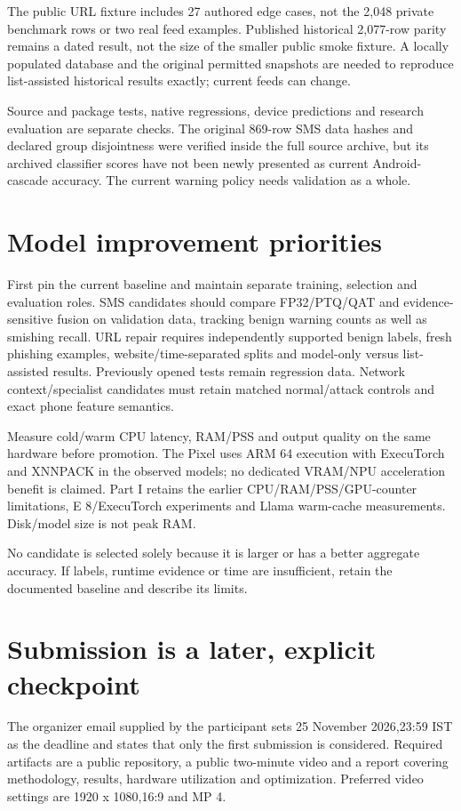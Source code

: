 \documentclass[11pt,a4paper,oneside]{report}
\begin{document}
The public URL fixture includes 27 authored edge cases, not the 2,048 private benchmark rows or two real feed examples. Published historical 2,077-row parity remains a dated result, not the size of the smaller public smoke fixture. A locally populated database and the original permitted snapshots are needed to reproduce list-assisted historical results exactly; current feeds can change.

Source and package tests, native regressions, device predictions and research evaluation are separate checks. The original 869-row SMS data hashes and declared group disjointness were verified inside the full source archive, but its archived classifier scores have not been newly presented as current Android-cascade accuracy. The current warning policy needs validation as a whole.

\section{Model improvement priorities}
First pin the current baseline and maintain separate training, selection and evaluation roles. SMS candidates should compare FP32/PTQ/QAT and evidence-sensitive fusion on validation data, tracking benign warning counts as well as smishing recall. URL repair requires independently supported benign labels, fresh phishing examples, website/time-separated splits and model-only versus list-assisted results. Previously opened tests remain regression data. Network context/specialist candidates must retain matched normal/attack controls and exact phone feature semantics.

Measure cold/warm CPU latency, RAM/PSS and output quality on the same hardware before promotion. The Pixel uses ARM 64 execution with ExecuTorch and XNNPACK in the observed models; no dedicated VRAM/NPU acceleration benefit is claimed. Part I retains the earlier CPU/RAM/PSS/GPU-counter limitations, E 8/ExecuTorch experiments and Llama warm-cache measurements. Disk/model size is not peak RAM.

No candidate is selected solely because it is larger or has a better aggregate accuracy. If labels, runtime evidence or time are insufficient, retain the documented baseline and describe its limits.

\section{Submission is a later, explicit checkpoint}
The organizer email supplied by the participant sets 25 November 2026,23:59 IST as the deadline and states that only the first submission is considered. Required artifacts are a public repository, a public two-minute video and a report covering methodology, results, hardware utilization and optimization. Preferred video settings are 1920 x 1080,16:9 and MP 4.
\end{document}
